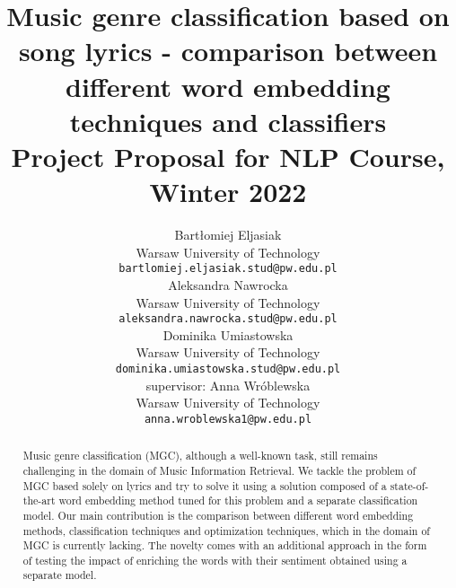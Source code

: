 \documentclass[11pt]{article}
\title{Music genre classification based on song lyrics - comparison between different word embedding techniques and classifiers \\Project Proposal for NLP Course, Winter 2022}
\author{Bartłomiej Eljasiak \\
  Warsaw University of Technology \\
  {\tt\small bartlomiej.eljasiak.stud@pw.edu.pl} \\\And
  Aleksandra Nawrocka \\
  Warsaw University of Technology \\
  {\tt\small aleksandra.nawrocka.stud@pw.edu.pl} \\
  \AND
  Dominika Umiastowska \\
  Warsaw University of Technology \\
  {\tt\small dominika.umiastowska.stud@pw.edu.pl} \\\And 
  supervisor: Anna Wróblewska\\
  Warsaw University of Technology \\
  {\tt\small anna.wroblewska1@pw.edu.pl}\\}
\date{}
\begin{document}
\raggedbottom

\maketitle

\vspace{5em}

\begin{abstract}
Music genre classification (MGC), although a well-known task, still remains challenging in the domain of Music Information Retrieval. We tackle the problem of MGC based solely on lyrics and try to solve it using a solution composed of a state-of-the-art word embedding method tuned for this problem and a separate classification model. Our main contribution is the comparison between different word embedding methods, classification techniques and optimization techniques, which in the domain of MGC is currently lacking. The novelty comes with an additional approach in the form of testing the impact of enriching the words with their sentiment obtained using a separate model.


\begin{comment}
Music genre classification (MGC), although a well-known task, still remains challenging in the domain of Music Information Retrieval. We tackle the problem of MGC based solely on lyrics, but in the process we also test the impact of enriching the words with their sentiment obtained using a separate model. Our solution is composed of a state-of-the-art word embedding method tuned for this problem and a separate classification model. The novelty comes in the form of providing the comparison between different word embedding methods, classification techniques and optimization techniques, which in the domain of MGC is currently lacking. 
\end{comment}
\end{abstract}




\end{document}

